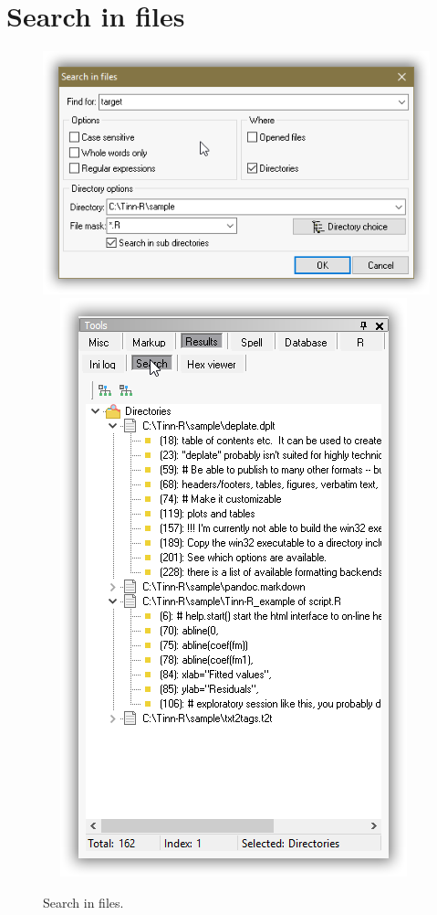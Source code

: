 
\hypertarget{working_searchinfiles}{}
\section{Search in files}

\begin{figure}[H]
  \includegraphics[scale=0.35]{./res/searchinfiles.png}~~
  \includegraphics[scale=0.35]{./res/tools_results_search.png}\\
  \caption{Search in files.}
  \label{fig:searchinfiles}
\end{figure}


